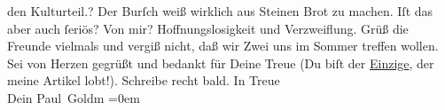 \begin{ledgroupsized}[t]{13cm}
{{{                  den Kulturteil.}}}\label{K_L02613-1h}? Der Burſch weiß wirklich aus Steinen Brot zu machen. Iſt das aber auch
               ſeriös?\pend
           \pstart
           Von mir? Hoffnungslosigkeit und Verzweiflung.\pend
           \pstart
           Grüß die Freunde vielmals und vergiß nicht, daß wir Zwei uns im Sommer treffen
               wollen. Sei von Herzen gegrüßt und bedankt für Deine Treue (Du biſt der \uline{Einzige}, der meine Artikel lobt!). Schreibe recht
               bald.\pend
           \pstart
           In Treue {\\[\baselineskip]}Dein \spacefill\mbox{Paul Goldm}\pend
           \leftskip=0em{}\endnumbering{}\end{ledgroupsized}\begin{anhang}\end{anhang}\newcommand{\dateiname}{L02613}\newcommand{\titel}{Paul Goldmann an Arthur Schnitzler, 21. 3. [1894]}\newcommand{\editorInnen}{Martin Anton Müller und Laura Untner}
            \footnotesize
\begin{ledgroupsized}[t]{11.5cm}
\end{ledgroupsized}
         
      